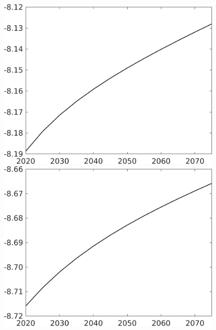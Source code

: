 \documentclass[12pt]{article}
\begin{document}
\begin{figure}[h!!]
\begin{minipage}[]{0.32\textwidth}
	\end{minipage}	
	\begin{minipage}[]{0.32\textwidth}
		\includegraphics[width=1\textwidth]{../../codding_model/own_basedOnFried/optimalPol_010922_revision/figures/all_13Sept22/CompTaul_Equlab_LFBAUPer_Reg0_F_spillover0_nsk0_xgr0_knspil0_sep1_countec0_GovRev0_etaa0.79.png}
	\end{minipage}	
	\begin{minipage}[]{0.32\textwidth}
		\includegraphics[width=1\textwidth]{../../codding_model/own_basedOnFried/optimalPol_010922_revision/figures/all_13Sept22/CompTaul_Equlab_LFBAUPer_Reg0_G_spillover0_nsk0_xgr0_knspil0_sep1_countec0_GovRev0_etaa0.79.png}

\end{minipage}
\end{figure}
\end{document}
